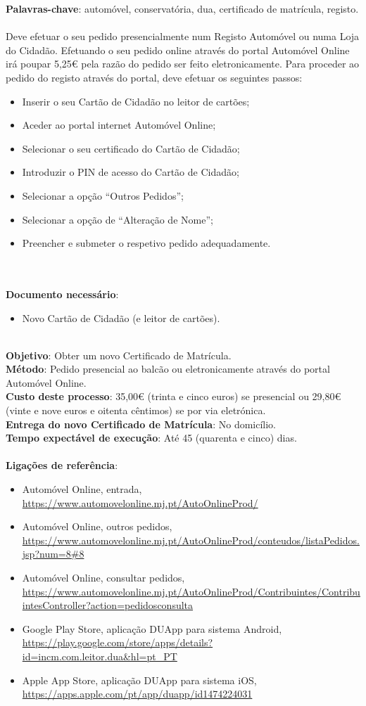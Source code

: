 \textbf{Palavras-chave}: automóvel, conservatória, dua, certificado de matrícula, registo. \\
\\
Deve efetuar o seu pedido presencialmente num Registo Automóvel ou numa
Loja do Cidadão. Efetuando o seu pedido online através do portal
Automóvel Online irá poupar 5,25€ pela razão do pedido ser feito
eletronicamente. Para proceder ao pedido do registo através do portal,
deve efetuar os seguintes passos:
\begin{itemize}
	\item Inserir o seu Cartão de Cidadão no leitor de cartões;
	\item Aceder ao portal internet Automóvel Online;
	\item Selecionar o seu certificado do Cartão de Cidadão;
	\item Introduzir o PIN de acesso do Cartão de Cidadão;
	\item Selecionar a opção ``Outros Pedidos'';
	\item Selecionar a opção de ``Alteração de Nome'';
	\item Preencher e submeter o respetivo pedido adequadamente.
\end{itemize}
\leavevmode\\
\newpage
\leavevmode\\
\textbf{Documento necessário}:
\begin{itemize}
	\item Novo Cartão de Cidadão (e leitor de cartões).
\end{itemize}
\leavevmode\\
\textbf{Objetivo}: Obter um novo Certificado de Matrícula. \\
\textbf{Método}: Pedido presencial ao balcão ou eletronicamente através do portal Automóvel Online. \\
\textbf{Custo deste processo}: 35,00€ (trinta e cinco euros) se presencial ou 29,80€ (vinte e nove euros e oitenta cêntimos) se por via eletrónica. \\
\textbf{Entrega do novo	Certificado de Matrícula}: No domicílio. \\
\textbf{Tempo expectável de	execução}: Até 45 (quarenta e cinco) dias. \\
\\
\textbf{Ligações de referência}:
\begin{itemize}
	\item Automóvel Online, entrada, \url{https://www.automovelonline.mj.pt/AutoOnlineProd/}
	\item Automóvel Online, outros pedidos, \url{https://www.automovelonline.mj.pt/AutoOnlineProd/conteudos/listaPedidos.jsp?num=8\#8}
	\item Automóvel Online, consultar pedidos, \url{https://www.automovelonline.mj.pt/AutoOnlineProd/Contribuintes/ContribuintesController?action=pedidosconsulta}
	\item Google Play Store, aplicação DUApp para sistema Android, \url{https://play.google.com/store/apps/details?id=incm.com.leitor.dua\&hl=pt\_PT}
	\item Apple App Store, aplicação DUApp para sistema iOS, \url{https://apps.apple.com/pt/app/duapp/id1474224031}
\end{itemize}

